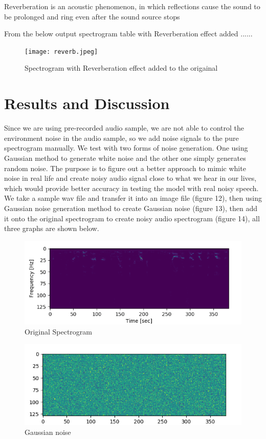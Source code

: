 \documentclass[runningheads,a4paper]{llncs}
\begin{document}
Reverberation is an acoustic phenomenon, in which reflections cause the sound to be prolonged and ring even after the sound source stops \cite{24}

From the below output spectrogram table with Reverberation effect added ......
\begin{figure}[H]
\texttt{[image: reverb.jpeg]}
\caption{Spectrogram with Reverberation effect added to the origainal }
\label{fig:framework}
\end{figure}




\section{Results and Discussion}
Since we are using pre-recorded audio sample, we are not able to control the environment noise in the audio sample, so we add noise signals to the pure spectrogram manually. We test with two forms of noise generation. One using Gaussian method to generate white noise and the other one simply generates random noise. The purpose is to figure out a better approach to mimic white noise in real life and create noisy audio signal close to what we hear in our lives, which would provide better accuracy in testing the model with real noisy speech.\\

We take a sample wav file and transfer it into an image file (figure 12), then using Gaussian noise generation method to create Gaussian noise (figure 13), then add it onto the original spectrogram to create noisy audio spectrogram (figure 14), all three graphs are shown below.\\

\begin{figure}[H]
\includegraphics[scale=0.25]{figureA.png}
\caption{Original Spectrogram}
\label{fig:framework}
\end{figure}

\begin{figure}[H]
\includegraphics[scale=0.25]{figureB.png}
\caption{Gaussian noise}
\label{fig:framework}
\end{figure}
\end{document}
